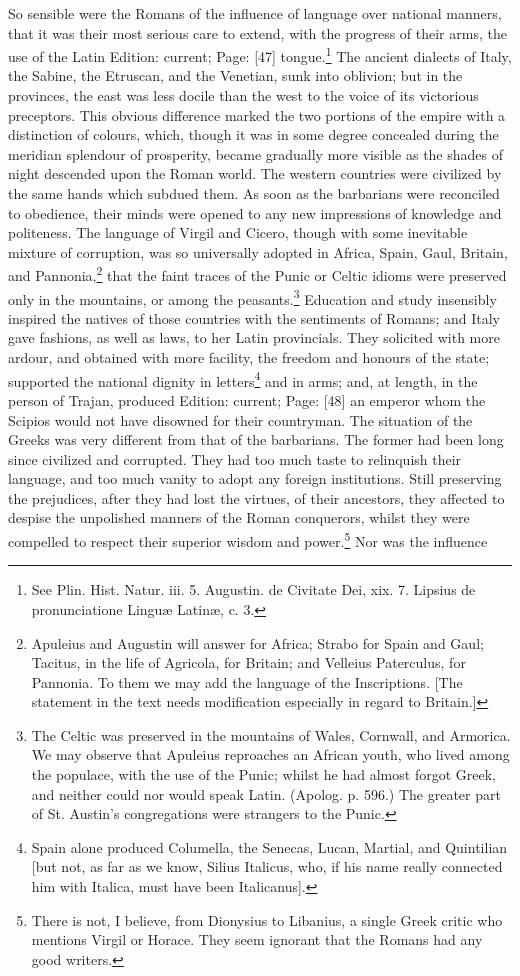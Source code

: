 So sensible were the Romans of the influence of language over national manners, that it was their most serious care to extend, with the progress of their arms, the use of the Latin Edition: current; Page: [47] tongue.\footnote{See Plin. Hist. Natur. iii. 5. Augustin. de Civitate Dei, xix. 7. Lipsius de pronunciatione Linguæ Latinæ, c. 3.} The ancient dialects of Italy, the Sabine, the Etruscan, and the Venetian, sunk into oblivion; but in the provinces, the east was less docile than the west to the voice of its victorious preceptors. This obvious difference marked the two portions of the empire with a distinction of colours, which, though it was in some degree concealed during the meridian splendour of prosperity, became gradually more visible as the shades of night descended upon the Roman world. The western countries were civilized by the same hands which subdued them. As soon as the barbarians were reconciled to obedience, their minds were opened to any new impressions of knowledge and politeness. The language of Virgil and Cicero, though with some inevitable mixture of corruption, was so universally adopted in Africa, Spain, Gaul, Britain, and Pannonia,\footnote{Apuleius and Augustin will answer for Africa; Strabo for Spain and Gaul; Tacitus, in the life of Agricola, for Britain; and Velleius Paterculus, for Pannonia. To them we may add the language of the Inscriptions. [The statement in the text needs modification especially in regard to Britain.]} that the faint traces of the Punic or Celtic idioms were preserved only in the mountains, or among the peasants.\footnote{The Celtic was preserved in the mountains of Wales, Cornwall, and Armorica. We may observe that Apuleius reproaches an African youth, who lived among the populace, with the use of the Punic; whilst he had almost forgot Greek, and neither could nor would speak Latin. (Apolog. p. 596.) The greater part of St. Austin\texthebrew{}’s congregations were strangers to the Punic.} Education and study insensibly inspired the natives of those countries with the sentiments of Romans; and Italy gave fashions, as well as laws, to her Latin provincials. They solicited with more ardour, and obtained with more facility, the freedom and honours of the state; supported the national dignity in letters\footnote{Spain alone produced Columella, the Senecas, Lucan, Martial, and Quintilian [but not, as far as we know, Silius Italicus, who, if his name really connected him with Italica, must have been Italicanus].} and in arms; and, at length, in the person of Trajan, produced Edition: current; Page: [48] an emperor whom the Scipios would not have disowned for their countryman. The situation of the Greeks was very different from that of the barbarians. The former had been long since civilized and corrupted. They had too much taste to relinquish their language, and too much vanity to adopt any foreign institutions. Still preserving the prejudices, after they had lost the virtues, of their ancestors, they affected to despise the unpolished manners of the Roman conquerors, whilst they were compelled to respect their superior wisdom and power.\footnote{There is not, I believe, from Dionysius to Libanius, a single Greek critic who mentions Virgil or Horace. They seem ignorant that the Romans had any good writers.} Nor was the influence 